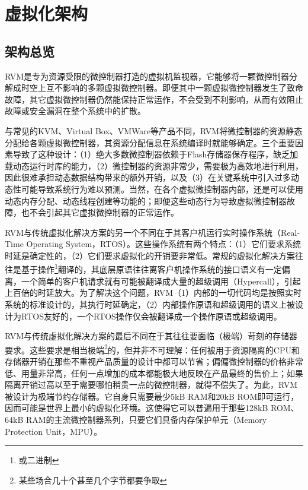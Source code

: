 \chapter{虚拟化架构}\label{ch:2-virtualization-architecture}

\section{架构总览}\label{sec:2-1}

RVM是专为资源受限的微控制器打造的虚拟机监视器，它能够将一颗微控制器分解成时空上互不影响的多颗虚拟微控制器。即便其中一颗虚拟微控制器发生了致命故障，其它虚拟微控制器仍然能保持正常运作，不会受到不利影响，从而有效阻止故障或安全漏洞在整个系统中的扩散。

与常见的KVM、Virtual
Box、VMWare等产品不同，RVM将微控制器的资源静态分配给各颗虚拟微控制器，其资源分配信息在系统编译时就能够确定。三个重要因素导致了这种设计：（1）绝大多数微控制器依赖于Flash存储器保存程序，缺乏加载动态运行时库的能力，（2）微控制器的资源非常少，需要极为高效地进行利用，因此很难承担动态数据结构带来的额外开销，以及（3）在关键系统中引入过多动态性可能导致系统行为难以预测。当然，在各个虚拟微控制器内部，还是可以使用动态内存分配、动态线程创建等功能的；即便这些动态行为导致虚拟微控制器故障，也不会引起其它虚拟微控制器的正常运作。

RVM与传统虚拟化解决方案的另一个不同在于其客户机运行实时操作系统（Real-Time
Operating
System，RTOS）。这些操作系统有两个特点：（1）它们要求系统时延是确定性的，（2）它们要求虚拟化的开销要非常低。常规的虚拟化解决方案往往是基于操作\footnote{或二进制}翻译的，其底层原语往往离客户机操作系统的接口语义有一定偏离，一个简单的客户机请求就有可能被翻译成大量的超级调用（Hypercall），引起上百倍的时延放大。为了解决这个问题，RVM（1）内部的一切代码均是按照实时系统的标准设计的，其执行时延确定，（2）内部操作原语和超级调用的语义上被设计为RTOS友好的，一个RTOS操作仅会被翻译成一个操作原语或超级调用。

RVM与传统虚拟化解决方案的最后不同在于其往往要面临（极端）苛刻的存储器要求。这些要求是相当极端\footnote{某些场合几十个甚至几个字节都要争取}的，但并非不可理解：任何被用于资源隔离的CPU和存储器开销在那些不重视产品质量的设计中都可以节省；偏偏微控制器的价格非常低、用量非常高，任何一点增加的成本都能极大地反映在产品最终的售价上；如果隔离开销过高以至于需要哪怕稍贵一点的微控制器，就得不偿失了。为此，RVM被设计为极端节约存储器。它自身只需要最少5kB
RAM和20kB
ROM即可运行，因而可能是世界上最小的虚拟化环境。这使得它可以普遍用于那些128kB
ROM、64kB RAM的主流微控制器系列，只要它们具备内存保护单元（Memory
Protection Unit，MPU）。

